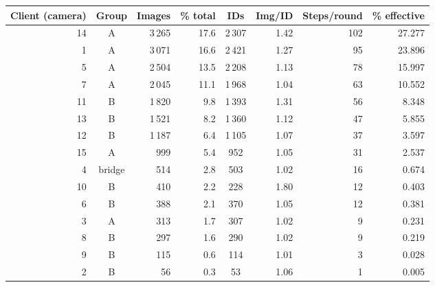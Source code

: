 \begin{tabular}{r c r r c r r r}
\toprule
Client (camera) & Group & Images & \% total & IDs & Img/ID & Steps/round & \% effective\\
\midrule
14 & A & 3\,265 & 17.6 & 2\,307 & 1.42 & 102 & 27.277\\
1 & A & 3\,071 & 16.6 & 2\,421 & 1.27 & 95 & 23.896\\
5 & A & 2\,504 & 13.5 & 2\,208 & 1.13 & 78 & 15.997\\
7 & A & 2\,045 & 11.1 & 1\,968 & 1.04 & 63 & 10.552\\
11 & B & 1\,820 & 9.8 & 1\,393 & 1.31 & 56 & 8.348\\
13 & B & 1\,521 & 8.2 & 1\,360 & 1.12 & 47 & 5.855\\
12 & B & 1\,187 & 6.4 & 1\,105 & 1.07 & 37 & 3.597\\
15 & A & 999 & 5.4 & 952 & 1.05 & 31 & 2.537\\
4 & bridge & 514 & 2.8 & 503 & 1.02 & 16 & 0.674\\
10 & B & 410 & 2.2 & 228 & 1.80 & 12 & 0.403\\
6 & B & 388 & 2.1 & 370 & 1.05 & 12 & 0.381\\
3 & A & 313 & 1.7 & 307 & 1.02 & 9 & 0.231\\
8 & B & 297 & 1.6 & 290 & 1.02 & 9 & 0.219\\
9 & B & 115 & 0.6 & 114 & 1.01 & 3 & 0.028\\
2 & B & 56 & 0.3 & 53 & 1.06 & 1 & 0.005\\
\bottomrule
\end{tabular}

